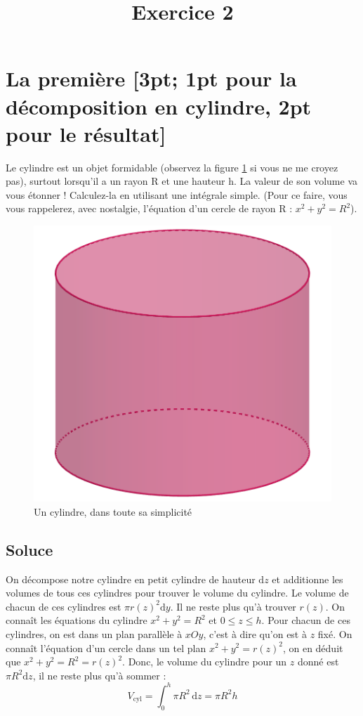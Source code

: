 \documentclass[a4paper, 11pt]{article}
\title{Exercice 2}
\author{}
\newcommand{\intg}{\mathrm{d}}
\begin{document}
\maketitle
\section{La première [3pt; 1pt pour la décomposition en cylindre, 2pt pour le résultat]}
Le cylindre est un objet formidable (observez la figure \ref{fig:cyl} si vous ne me croyez pas), surtout lorsqu'il a un rayon R et une hauteur h. La valeur de son volume va vous étonner ! Calculez-la en utilisant une intégrale simple. (Pour ce faire, vous vous rappelerez, avec nostalgie, l'équation d'un cercle de rayon R : $x^2+y^2=R^2$).

\begin{centering}

\begin{figure}
    \centering
    \includegraphics[width=0.5\columnwidth]{cylindre.png}
    \caption{Un cylindre, dans toute sa simplicité}
    \label{fig:cyl}
\end{figure}

\end{centering}

\subsection{Soluce}
On décompose notre cylindre en petit cylindre de hauteur $\intg z$ et additionne les volumes de tous ces cylindres pour trouver le volume du cylindre. Le volume de chacun de ces cylindres est $\pi r(z)^2 \intg y$. Il ne reste plus qu'à trouver $r(z)$.\newline
On connaît les équations du cylindre $x^2 + y^2 = R^2$ et $0\leq z \leq h$. Pour chacun de ces cylindres, on est dans un plan parallèle à $xOy$, c'est à dire qu'on est à $z$ fixé. On connaît l'équation d'un cercle dans un tel plan $x^2+y^2 = r(z)^2$, on en déduit que $x^2 + y^2 = R^2 = r(z)^2$. Donc, le volume du cylindre pour un $z$ donné est $\pi R^2 \intg z $, il ne reste plus qu'à sommer :
\begin{equation}
    V_{\mathrm{cyl}} = \displaystyle \int_{0}^{h} \pi R^2 \, \intg z = \pi R^2 h
\end{equation}
\end{document}
